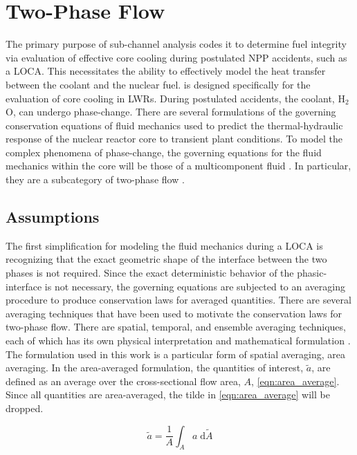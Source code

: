 \section{Two-Phase Flow}
\label{sect:two_phase_flow}
The primary purpose of sub-channel analysis codes it to determine fuel integrity via evaluation of effective core cooling during postulated NPP accidents, such as a LOCA.
This necessitates the ability to effectively model the heat transfer between the coolant and the nuclear fuel. 
\cobra{} is designed specifically for the evaluation of core cooling in LWRs.
During postulated accidents, the coolant, H$_2$O, can undergo phase-change.
There are several formulations of the governing conservation equations of fluid mechanics used to predict the thermal-hydraulic response of the nuclear reactor core to transient plant conditions.
To model the complex phenomena of phase-change, the governing equations for the fluid mechanics within the core will be those of a multicomponent fluid \cite{Drew1998}.
In particular, they are a subcategory of two-phase flow \cite{Todreas2011, Stewart1984, Ishii1984}.

\subsection{Assumptions}
\label{subsect:assumptions}

The first simplification for modeling the fluid mechanics during a LOCA is recognizing that the exact geometric shape of the interface between the two phases is not required.
Since the exact deterministic behavior of the phasic-interface is not necessary, the governing equations are subjected to an averaging procedure to produce conservation laws for averaged quantities.
There are several averaging techniques that have been used to motivate the conservation laws for two-phase flow.
There are spatial, temporal, and ensemble averaging techniques, each of which has its own physical interpretation and mathematical formulation \cite{Drew1998, Todreas2011}.
The formulation used in this work is a particular form of spatial averaging, area averaging.
In the area-averaged formulation, the quantities of interest, $\tilde{a}$, are defined as an average over the cross-sectional flow area, $A$, \eqref{eqn:area_average}.
Since all quantities are area-averaged, the tilde in \eqref{eqn:area_average} will be dropped.

\begin{equation}
\label{eqn:area_average}
\tilde{a} = \frac{1}{A}\int_{A} a \;\mathrm{d}\tilde{A}
\end{equation}

